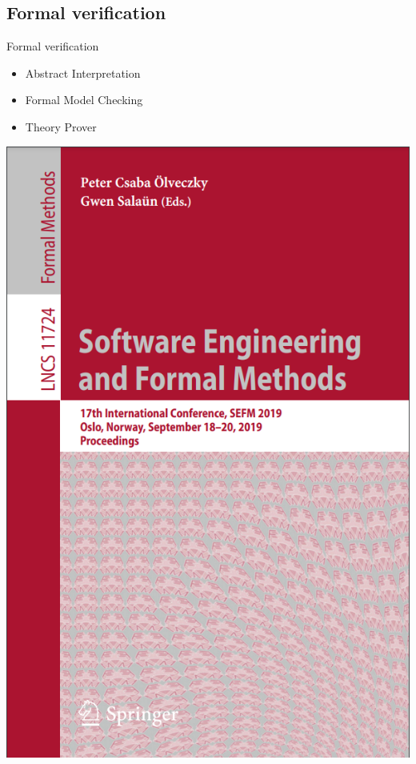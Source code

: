 \documentclass{beamer}
\begin{document}
\begin{CJK*}{UTF8}{bsmi}
    \section{Formal verification}
    \begin{frame}{{Formal verification}}
        \begin{multicols}{2}
            \begin{itemize}
                \setlength\itemsep{1em}
                \item Abstract Interpretation
                \item Formal Model Checking
                \item Theory Prover
            \end{itemize}
            \cite{Software_Engineering_and_Formal_Methods}
            \includegraphics[height=.8\textheight]{Software_Engineering_and_Formal_Methods.png}
        \end{multicols}


\end{frame}
\end{CJK*}
\end{document}
